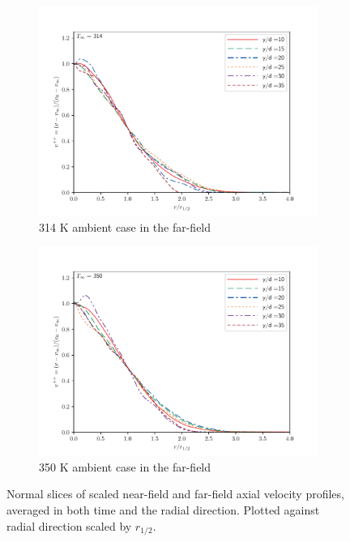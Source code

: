 \begin{figure}[H]
\begin{center}
\begin{subfigure}{0.45\textwidth}
	\includegraphics[scale=.45]{figures/Plots/radial/slices_5/314_ambient/r_vs_v.pdf}
	\caption{314 K ambient case in the far-field} \label{noniso_far_r_vs_v_1}
\end{subfigure}
\begin{subfigure}{0.45\textwidth}
	\includegraphics[scale=.45]{figures/Plots/radial/slices_5/350_ambient/r_vs_v.pdf}
	\caption{350 K ambient case in the far-field} \label{noniso_far_r_vs_v_2}
\end{subfigure}
\caption{Normal slices of scaled near-field and far-field axial velocity profiles, averaged in both time and the radial direction. Plotted against radial direction scaled by $r_{1/2}$.}
\label{noniso_near_r_v_features}
\end{center}
\end{figure}
